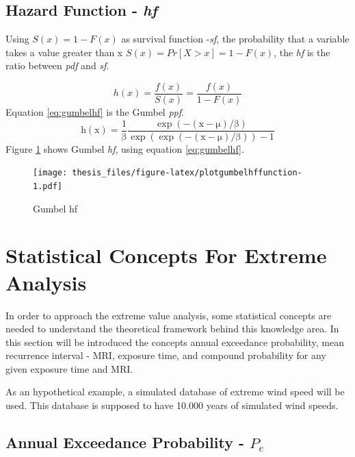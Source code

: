 \documentclass[12pt,oneside]{reedthesis}
\begin{document}
\hypertarget{hazard-function---hf}{%
\subsection{\texorpdfstring{Hazard Function - \emph{hf}}{Hazard Function - hf}}\label{hazard-function---hf}}

Using \(S(x) = 1 - F(x)\) as survival function -\emph{sf}, the probability that a variable takes a value greater than x \(S(x) = Pr[X > x] = 1 - F(x)\), the \emph{hf} is the ratio between \emph{pdf} and \emph{sf}.

\[
h(x) = \frac{f(x)}{S(x)} = \frac{f(x)}{1-F(x)}
\]
Equation \eqref{eq:gumbelhf} is the Gumbel \emph{ppf}.
\begin{equation}
\mathrm{
        h(x)= \frac{1}{\beta}\frac{\exp(-(x-\mu)/\beta)}{\exp(\exp(-(x-\mu)/\beta))-1}
       }
  \label{eq:gumbelhf}
\end{equation}
Figure \ref{fig:plotgumbelhffunction} shows Gumbel \emph{hf}, using equation \eqref{eq:gumbelhf}.

\footnotesize
\begin{figure}
\centering
\texttt{[image: thesis\_files/figure-latex/plotgumbelhffunction-1.pdf]}
\caption{\label{fig:plotgumbelhffunction}Gumbel hf}
\end{figure}
\normalsize

\hypertarget{statistical-concepts-for-extreme-analysis}{%
\section{Statistical Concepts For Extreme Analysis}\label{statistical-concepts-for-extreme-analysis}}

In order to approach the extreme value analysis, some statistical concepts are needed to understand the theoretical framework behind this knowledge area. In this section will be introduced the concepts annual exceedance probability, mean recurrence interval - MRI, exposure time, and compound probability for any given exposure time and MRI.

As an hypothetical example, a simulated database of extreme wind speed will be used. This database is supposed to have 10.000 years of simulated wind speeds.

\hypertarget{annual-exceedance-probability---p_e}{%
\subsection{\texorpdfstring{Annual Exceedance Probability - \(P_e\)}{Annual Exceedance Probability - P\_e}}\label{annual-exceedance-probability---p_e}}
\end{document}
